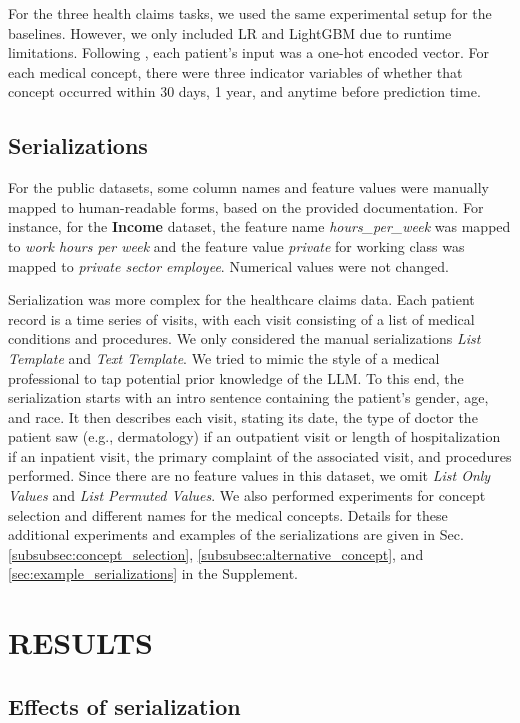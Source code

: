 For the three health claims tasks, we used the same experimental setup for the baselines. However, we only included LR and LightGBM due to runtime limitations. Following \citet{kodialam_deep_2020}, each patient's input was a one-hot encoded vector. For each medical concept, there were three indicator variables of whether that concept occurred within 30 days, 1 year, and anytime before prediction time.

\subsection{Serializations}
For the public datasets, some column names and feature values were manually mapped to human-readable forms, based on the provided documentation. For instance, for the \textbf{Income} dataset, the feature name \emph{hours\_per\_week} was mapped to \emph{work hours per week} and the feature value \emph{private} for working class was mapped to \emph{private sector employee}. Numerical values were not changed.

Serialization was more complex for the healthcare claims data. Each patient record is a time series of visits, with each visit consisting of a list of medical conditions and procedures. We only considered the manual serializations \emph{List Template} and \emph{Text Template}. We tried to mimic the style of a medical professional to tap potential prior knowledge of the LLM. To this end, the serialization starts with an intro sentence containing the patient's gender, age, and race. It then describes each visit, stating its date, the type of doctor the patient saw (e.g., dermatology) if an outpatient visit or length of hospitalization if an inpatient visit, the primary complaint of the associated visit, and procedures performed. Since there are no feature values in this dataset, we omit \emph{List Only Values} and \emph{List Permuted Values}. We also performed experiments for concept selection and different names for the medical concepts. Details for these additional experiments and examples of the serializations are given in Sec. \ref{subsubsec:concept_selection}, \ref{subsubsec:alternative_concept}, and \ref{sec:example_serializations} in the Supplement.

\section{RESULTS}

\subsection{Effects of serialization}

